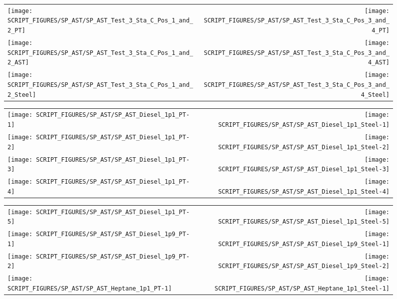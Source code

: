 \begin{figure}[!ht]
\begin{tabular*}{\textwidth}{l@{\extracolsep{\fill}}r}
\texttt{[image: SCRIPT\_FIGURES/SP\_AST/SP\_AST\_Test\_3\_Sta\_C\_Pos\_1\_and\_2\_PT]} &
\texttt{[image: SCRIPT\_FIGURES/SP\_AST/SP\_AST\_Test\_3\_Sta\_C\_Pos\_3\_and\_4\_PT]} \\
\texttt{[image: SCRIPT\_FIGURES/SP\_AST/SP\_AST\_Test\_3\_Sta\_C\_Pos\_1\_and\_2\_AST]} &
\texttt{[image: SCRIPT\_FIGURES/SP\_AST/SP\_AST\_Test\_3\_Sta\_C\_Pos\_3\_and\_4\_AST]} \\
\texttt{[image: SCRIPT\_FIGURES/SP\_AST/SP\_AST\_Test\_3\_Sta\_C\_Pos\_1\_and\_2\_Steel]} &
\texttt{[image: SCRIPT\_FIGURES/SP\_AST/SP\_AST\_Test\_3\_Sta\_C\_Pos\_3\_and\_4\_Steel]}
\end{tabular*}
\label{SP_Test_3_Station_C}
\end{figure}

\clearpage

\begin{figure}[!ht]
\begin{tabular*}{\textwidth}{l@{\extracolsep{\fill}}r}
\texttt{[image: SCRIPT\_FIGURES/SP\_AST/SP\_AST\_Diesel\_1p1\_PT-1]}  &  \texttt{[image: SCRIPT\_FIGURES/SP\_AST/SP\_AST\_Diesel\_1p1\_Steel-1]}    \\
\texttt{[image: SCRIPT\_FIGURES/SP\_AST/SP\_AST\_Diesel\_1p1\_PT-2]}  &  \texttt{[image: SCRIPT\_FIGURES/SP\_AST/SP\_AST\_Diesel\_1p1\_Steel-2]}    \\
\texttt{[image: SCRIPT\_FIGURES/SP\_AST/SP\_AST\_Diesel\_1p1\_PT-3]}  &  \texttt{[image: SCRIPT\_FIGURES/SP\_AST/SP\_AST\_Diesel\_1p1\_Steel-3]}    \\
\texttt{[image: SCRIPT\_FIGURES/SP\_AST/SP\_AST\_Diesel\_1p1\_PT-4]}  &  \texttt{[image: SCRIPT\_FIGURES/SP\_AST/SP\_AST\_Diesel\_1p1\_Steel-4]}
\end{tabular*}
\label{SP_Diesel_1p1_PT_Steel}
\end{figure}

\begin{figure}[!ht]
\begin{tabular*}{\textwidth}{l@{\extracolsep{\fill}}r}
\texttt{[image: SCRIPT\_FIGURES/SP\_AST/SP\_AST\_Diesel\_1p1\_PT-5]}  &  \texttt{[image: SCRIPT\_FIGURES/SP\_AST/SP\_AST\_Diesel\_1p1\_Steel-5]}   \\
\texttt{[image: SCRIPT\_FIGURES/SP\_AST/SP\_AST\_Diesel\_1p9\_PT-1]}  &  \texttt{[image: SCRIPT\_FIGURES/SP\_AST/SP\_AST\_Diesel\_1p9\_Steel-1]}   \\
\texttt{[image: SCRIPT\_FIGURES/SP\_AST/SP\_AST\_Diesel\_1p9\_PT-2]}  &  \texttt{[image: SCRIPT\_FIGURES/SP\_AST/SP\_AST\_Diesel\_1p9\_Steel-2]}   \\
\texttt{[image: SCRIPT\_FIGURES/SP\_AST/SP\_AST\_Heptane\_1p1\_PT-1]} &  \texttt{[image: SCRIPT\_FIGURES/SP\_AST/SP\_AST\_Heptane\_1p1\_Steel-1]}
\end{tabular*}
\label{SP_Diesel_1p9_PT_Steel}
\end{figure}

